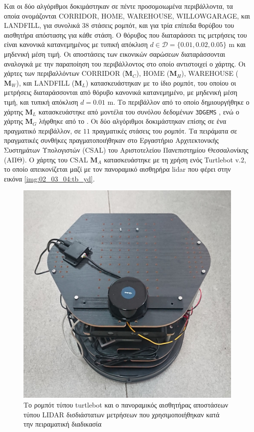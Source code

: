 Και οι δύο αλγόριθμοι δοκιμάστηκαν σε πέντε προσομοιωμένα περιβάλλοντα, τα
οποία ονομάζονται CORRIDOR, HOME, WAREHOUSE, WILLOWGARAGE, και LANDFILL, για
συνολικά $38$ στάσεις ρομπότ, και για τρία επίπεδα θορύβου του αισθητήρα
απόστασης για κάθε στάση. Ο θόρυβος που διαταράσσει τις μετρήσεις του είναι
κανονικά κατανεμημένος με τυπική απόκλιση $d \in \mathcal{D} = \{0.01, 0.02,
0.05\}$ m και μηδενική μέση τιμή. Οι αποστάσεις των εικονικών σαρώσεων
διαταράσσονται αναλογικά με την παραποίηση του περιβάλλοντος στο οποίο
αντιστοιχεί ο χάρτης.  Οι χάρτες των περιβαλλόντων CORRIDOR ($\bm{M}_C$), HOME
($\bm{M}_H$), WAREHOUSE ($\bm{M}_W$), και LANDFILL ($\bm{M}_L$) κατασκευάστηκαν
με το ίδιο ρομπότ, του οποίου οι μετρήσεις διαταράσσονται από θόρυβο κανονικά
κατανεμημένο, με μηδενική μέση τιμή, και τυπική απόκλιση $d = 0.01$ m. Το
περιβάλλον από το οποίο δημιουργήθηκε ο χάρτης $\bm{M}_L$ κατασκευάστηκε από
μοντέλα του συνόλου δεδομένων \texttt{3DGEMS} \cite{Rasouli2017}, ενώ ο χάρτης
$\bm{M}_G$ λήφθηκε από το \cite{willow_map}.  Οι δύο αλγόριθμοι δοκιμάστηκαν
επίσης σε ένα πραγματικό περιβάλλον, σε $11$ πραγματικές στάσεις του ρομπότ. Τα
πειράματα σε πραγματικές συνθήκες πραγματοποιήθηκαν στο Εργαστήριο
Αρχιτεκτονικής Συστημάτων Υπολογιστών (CSAL) του Αριστοτελείου Πανεπιστημίου
Θεσσαλονίκης (ΑΠΘ). Ο χάρτης του CSAL $\bm{M}_A$ κατασκευάστηκε με τη χρήση
ενός Turtlebot v.$2$, το οποίο απεικονίζεται μαζί με τον πανοραμικό αισθηρήρα
lidar που φέρει στην εικόνα \ref{img:02_03_04:tb_yd}.

\begin{figure}\centering
  \includegraphics[scale=0.2]{./figures/parts/02/chapters/03/sections/04/tb_yd.jpg}
  \caption{\small Το ρομπότ τύπου turtlebot και ο πανοραμικός αισθητήρας
           αποστάσεων τύπου LIDAR δισδιάστατων μετρήσεων που χρησιμοποιήθηκαν
           κατά την πειραματική διαδικασία}
  \label{img:02_03_04:tb_yd}
\label{}
\end{figure}

